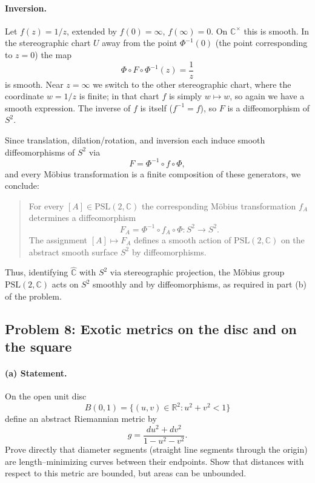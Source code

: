 \documentclass[12pt,a4paper]{article}
\theoremstyle{plain}
\theoremstyle{definition}      %
\begin{document}
	\paragraph{Inversion.}
	Let $f(z) = 1/z$, extended by $f(0)=\infty$, $f(\infty)=0$.  On
	$\mathbb{C}^{\times}$ this is smooth.  In the stereographic chart $U$ away
	from the point $\Phi^{-1}(0)$ (the point corresponding to $z=0$) the map
	\[
	\Phi\circ F\circ\Phi^{-1}(z)=\frac{1}{z}
	\]
	is smooth.  Near $z=\infty$ we switch to the other stereographic chart,
	where the coordinate $w=1/z$ is finite; in that chart $f$ is simply
	$w\mapsto w$, so again we have a smooth expression.  The inverse of $f$ is
	itself ($f^{-1}=f$), so $F$ is a diffeomorphism of $S^{2}$.
	
	\medskip
	
	Since translation, dilation/rotation, and inversion each induce smooth
	diffeomorphisms of $S^{2}$ via
	\[
	F = \Phi^{-1}\circ f\circ\Phi,
	\]
	and every Möbius transformation is a finite composition of these generators,
	we conclude:
	
	\begin{quote}
		For every $[A]\in\mathrm{PSL}(2,\mathbb{C})$ the corresponding Möbius
		transformation $f_A$ determines a diffeomorphism
		\[
		F_A = \Phi^{-1}\circ f_A\circ\Phi : S^{2}\to S^{2}.
		\]
		The assignment $[A]\mapsto F_A$ defines a smooth action of
		$\mathrm{PSL}(2,\mathbb{C})$ on the abstract smooth surface $S^{2}$ by
		diffeomorphisms.
	\end{quote}
	
	Thus, identifying $\widehat{\mathbb{C}}$ with $S^{2}$ via stereographic
	projection, the Möbius group $\mathrm{PSL}(2,\mathbb{C})$ acts on $S^{2}$
	smoothly and by diffeomorphisms, as required in part (b) of the problem.
	
	
	\subsection*{Problem 8: Exotic metrics on the disc and on the square}
	
	\paragraph{(a) Statement.}
	On the open unit disc
	\[
	B(0,1) = \{(u,v)\in\mathbb{R}^2 : u^2+v^2<1\}
	\]
	define an abstract Riemannian metric by
	\[
	g = \frac{du^2+dv^2}{1-u^2-v^2}.
	\]
	Prove directly that diameter segments (straight line segments through the origin)
	are length–minimizing curves between their endpoints. Show that distances with
	respect to this metric are bounded, but areas can be unbounded.
	
\end{document}
